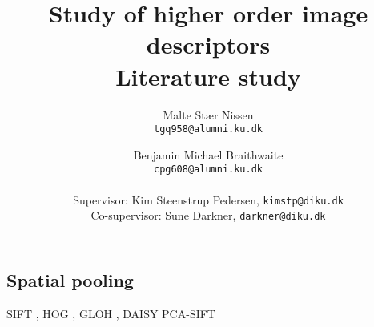 \documentclass[11pt,a4paper]{article}
\title{\bfseries{Study of higher order image descriptors}\\Literature study}
\author{
    Malte Stær Nissen \\\texttt{tgq958@alumni.ku.dk}
    \and
    Benjamin Michael Braithwaite \\ \texttt{cpg608@alumni.ku.dk}
    \\
    \\ \small{Supervisor: Kim Steenstrup Pedersen, \texttt{kimstp@diku.dk}}
    \\ \small{Co-supervisor: Sune Darkner, \texttt{darkner@diku.dk}}
    }
\begin{document}
\maketitle

\subsection{Spatial pooling}

SIFT \cite{lowe2004distinctive},
HOG \cite{dalal2005histograms},
GLOH \cite{mikolajczyk2005performance},
DAISY 
PCA-SIFT





\end{document}
